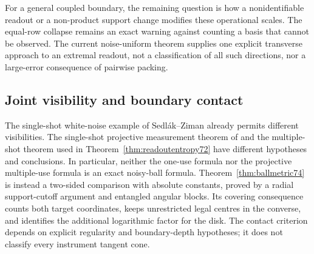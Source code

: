 For a general coupled boundary, the remaining question is how a
nonidentifiable readout or a non-product support change modifies these
operational scales. The equal-row collapse remains an exact warning
against counting a basis that cannot be observed. The current
noise-uniform theorem supplies one explicit transverse approach to an
extremal readout, not a classification of all such directions, nor a
large-error consequence of pairwise packing.

\subsection{Joint visibility and boundary contact}
The single-shot white-noise example of Sedl\'ak--Ziman \cite{SZ74}
already permits different visibilities. The single-shot projective
measurement theorem of \cite{PPKK74} and the multiple-shot theorem
used in Theorem~\ref{thm:readoutentropy72} have different hypotheses and
conclusions. In particular, neither the one-use formula nor the
projective multiple-use formula is an exact noisy-ball formula.
Theorem~\ref{thm:ballmetric74} is instead a two-sided comparison with
absolute constants, proved by a radial support-cutoff argument and
entangled angular blocks. Its covering consequence counts both target
coordinates, keeps unrestricted legal centres in the converse, and
identifies the additional logarithmic factor for the disk.
The contact criterion depends on explicit regularity and boundary-depth
hypotheses; it does not classify every instrument tangent cone.
